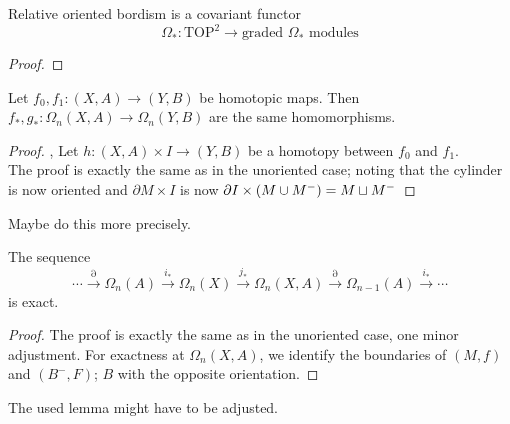 \documentclass[a4paper,11pt]{article}
\begin{document}
\begin{lemma}
    Relative oriented bordism is a covariant functor
    \[\Omega_\ast:\mathrm{TOP}^2\to\text{graded }\Omega_\ast\text{ modules}\]
\end{lemma}

\begin{proof}
    
\end{proof}

\begin{lemma}
    Let \(f_0,f_1:(X,A)\to(Y,B)\) be homotopic maps. Then \(f_\ast,g_\ast:\Omega_n(X,A)\to\Omega_n(Y,B)\) are the same homomorphisms.
\end{lemma}

\begin{proof}\cite{atiyah}, \cite{conner}
    Let \(h:(X,A)\times I\to (Y,B)\) be a homotopy between \(f_0\) and \(f_1\).\\
    The proof is exactly the same as in the unoriented case; noting that the cylinder is now oriented and \(\partial M\times I\) is now \(\partial I\times (M\cup M^-)=M\sqcup M^-\)%
\end{proof}
Maybe do this more precisely.

\begin{lemma}
    The sequence
    \[\cdots\xrightarrow{\partial}\Omega_n(A)\xrightarrow{i_\ast}\Omega_n(X)\xrightarrow{j_\ast}\Omega_n(X,A)\xrightarrow{\partial}\Omega_{n-1}(A)\xrightarrow{i_\ast}\cdots\]
    is exact.
\end{lemma}

\begin{proof}\cite{conner}
    The proof is exactly the same as in the unoriented case, one minor adjustment. For exactness at \(\Omega_n(X,A)\), we identify the boundaries of \((M,f)\) and \((B^-,F)\); \(B\) with the opposite orientation.
\begin{comment}
    \begin{itemize}
        \item \textbf{Exactness at \(\Omega_n(A)\)}: \(i_\ast\circ\partial=0\), as \((M,f)\) is a nullbordism for \(i_\ast\circ\partial(M,f)=\partial(M,f)\)\\
        For a nullbordism \((B,g)\) of \(M,f\), \(\partial(B,g)=(M,f)\).
        \item \textbf{Exactness at \(\Omega_n(X)\)}: 
        \(j_\ast\circ i_\ast=0\) exactly as in the unoriented case.

        \item \textbf{Exactness at \(\Omega_n(X,A)\)}: 
    \end{itemize}
\end{comment}
\end{proof}
The used lemma might have to be adjusted.
\end{document}
